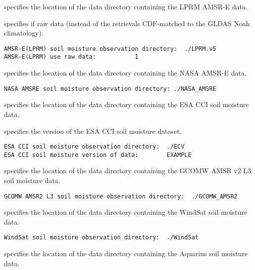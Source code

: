  
 specifies the location of the data directory containing the LPRM 
 AMSR-E data.

 specifies if raw data (instead of the retrievals CDF-matched to the
 GLDAS Noah climatology).
 

 \begin{Verbatim}[frame=single]
AMSR-E(LPRM) soil moisture observation directory:  ./LPRM.v5
AMSR-E(LPRM) use raw data:           1
 \end{Verbatim}

 
 specifies the location of the data directory containing the NASA 
 AMSR-E data.

 

 \begin{Verbatim}[frame=single]
NASA AMSRE soil moisture observation directory: ./NASA_AMSRE
 \end{Verbatim}

 
 specifies the location of the data directory containing the ESA CCI
 soil moisture data.

 specifies the version of the ESA CCI soil moisture dataset.
 

 \begin{Verbatim}[frame=single]
ESA CCI soil moisture observation directory:  ./ECV
ESA CCI soil moisture version of data:        EXAMPLE
 \end{Verbatim}

 
 specifies the location of the data directory containing the 
 GCOMW AMSR v2 L3 soil moisture data.
 

 \begin{Verbatim}[frame=single]
GCOMW AMSR2 L3 soil moisture observation directory:  ./GCOMW_AMSR2
 \end{Verbatim}

 
 specifies the location of the data directory containing the WindSat
 soil moisture data.
 

 \begin{Verbatim}[frame=single]
WindSat soil moisture observation directory:  ./WindSat
 \end{Verbatim}

 
 specifies the location of the data directory containing the Aquarius
 soil moisture data.
 

